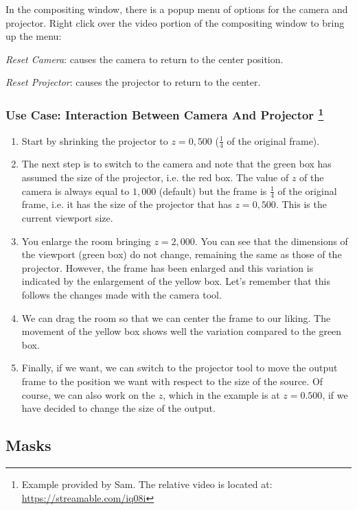 In the compositing window, there is a popup menu of options for the camera and projector. Right click over the video portion of the compositing window to bring up the menu:

\textit{Reset Camera}: causes the camera to return to the center position.
    	
\textit{Reset Projector}: causes the projector to return to the center.

\subsubsection*{Use Case: Interaction Between Camera And Projector \protect\footnote{Example provided by Sam. The relative video is located at: \url{https://streamable.com/iq08i}}}%
\label{ssub:use_case_interaction_camera_projector}

\begin{enumerate}
    \item Start by shrinking the projector to $z=0,500$ ($\frac{1}{4}$ of the original frame).
    \item The next step is to switch to the camera and note that the green box has assumed the size of the projector, i.e. the red box. The value of $z$ of the camera is always equal to $1,000$ (default) but the frame is $\frac{1}{4}$ of the original frame, i.e. it has the size of the projector that has $z=0,500$. This is the current viewport size.
    \item You enlarge the room bringing $z=2,000$. You can see that the dimensions of the viewport (green box) do not change, remaining the same as those of the projector. However, the frame has been enlarged and this variation is indicated by the enlargement of the yellow box. Let's remember that this follows the changes made with the camera tool.
    \item We can drag the room so that we can center the frame to our liking. The movement of the yellow box shows well the variation compared to the green box.
    \item Finally, if we want, we can switch to the projector tool to move the output frame to the position we want with respect to the size of the source. Of course, we can also work on the $z$, which in the example is at $z=0.500$, if we have decided to change the size of the output.
\end{enumerate}

\subsection{Masks}%
\label{sub:masks}

